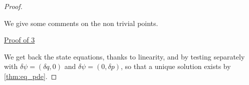 \documentclass[english,a4paper,9pt,oneside]{scrbook}	%
\theoremstyle{break}
\newenvironment{mproof}[1][\proofname]{%
  \begin{proof}[#1]$ $\par\nobreak\ignorespaces
}{%
  \end{proof}
}
\renewcommand*{\proofname}{Proof}
\theoremstyle{remark}
\newcommand{\mR}{\mathbb{R}}
\newcommand{\norm}[1]{\left\lVert#1\right\rVert}
\newcommand{\tr}{\text{tr}}
\newcommand{\tw}[1]{\texttt{#1}}
\begin{document}
\begin{mproof}

We give some comments on the non trivial points.

%
%
%
%
%
%

\underline{Proof of 3}

We get back the state equations, thanks to linearity, and by testing separately with $\delta \psi =(\delta q, 0)$ and $\delta \psi = (0,\delta p)$, so that a unique solution exists by \cref{thm:eq_pde}.
%
%


\end{mproof}
\end{document}
